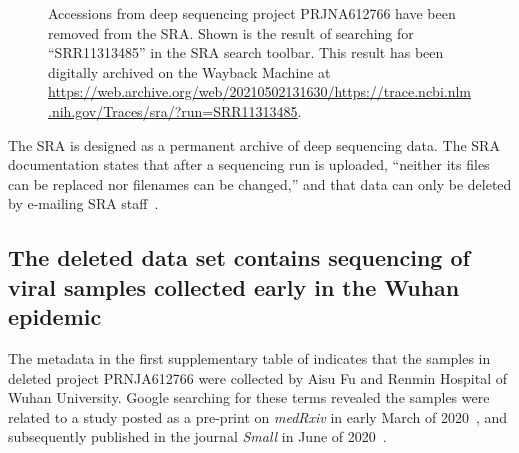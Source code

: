 \documentclass[9pt,twocolumn,twoside]{gsajnl_modified}
\begin{document}
\begin{figure}[]
\centering
{}
\caption{Accessions from deep sequencing project PRJNA612766 have been removed from the SRA.
Shown is the result of searching for ``SRR11313485'' in the SRA search toolbar.
This result has been digitally archived on the Wayback Machine at \url{https://web.archive.org/web/20210502131630/https://trace.ncbi.nlm.nih.gov/Traces/sra/?run=SRR11313485}.
}%
\label{fig:acc_removed}
\end{figure}

The SRA is designed as a permanent archive of deep sequencing data.
The SRA documentation states that after a sequencing run is uploaded, ``neither its files can be replaced nor filenames can be changed,'' and that data can only be deleted by e-mailing SRA staff~\citep{SRA_deletion}.

\subsection{The deleted data set contains sequencing of viral samples collected early in the Wuhan epidemic}
The metadata in the first supplementary table of \citet{farkas2020insights} indicates that the samples in deleted project PRNJA612766 were collected by Aisu Fu and Renmin Hospital of Wuhan University.
Google searching for these terms revealed the samples were related to a study posted as a pre-print on \textit{medRxiv} in early March of 2020~\citep{wang2020medRxiv}, and subsequently published in the journal \textit{Small} in June of 2020~\citep{wang2020small}.
\end{document}
